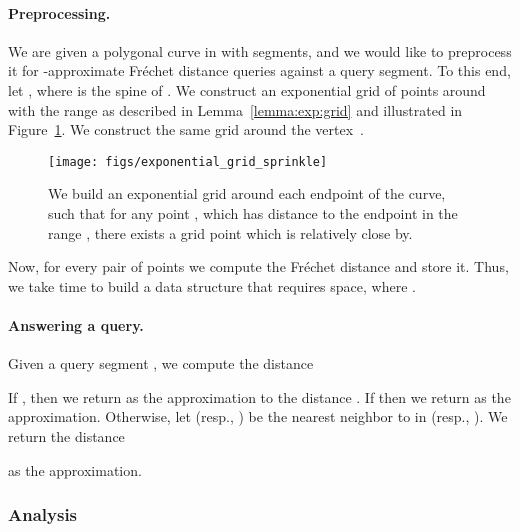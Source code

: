 \documentclass[12pt]{article}
\newcommand{\lemref}[1]{Lemma~\ref{lemma:#1}}
\newcommand{\figlab}[1]{\label{fig:#1}}
\newcommand{\figref}[1]{Figure~\ref{fig:#1}}
\newcommand{\Frechet}{Fr\'{e}c{h}e{}t\xspace}\providecommand{\Arr}{\mathop{\mathrm{\EuScript{A}}}}
\numberwithin{figure}{section}
\numberwithin{equation}{section}
\begin{document}
\paragraph{Preprocessing.}
We are given a polygonal curve  in  with  segments, and
we would like to preprocess it for -approximate \Frechet
distance queries against a query segment. To this end, let , where  is the spine of .  We construct an
exponential grid  of points around  with the range 
 as described in \lemref{exp:grid}
 and illustrated in \figref{exp:sprinkle}.  
We construct the same grid  around the vertex~.

\begin{figure}\centering
\texttt{[image: figs/exponential\_grid\_sprinkle]}
\caption{{We build an exponential grid around each endpoint of the curve, such that 
for any point , which has distance to the endpoint in the range
, there exists a grid point  which is relatively close by.}}
\figlab{exp:sprinkle}
\end{figure}

Now, for every pair of points  we
compute the \Frechet distance  and store it. Thus, we take 
 time to build a data structure 
that requires  space, where .

\paragraph{Answering a query.}
Given a query segment , we compute the distance

If , then we return  as the approximation
to the distance .  
If  then we return  as the approximation. 
Otherwise, let  (resp., ) be the nearest neighbor to
 in  (resp., ). We return the distance

as the approximation.

\subsubsection{Analysis}
\end{document}
